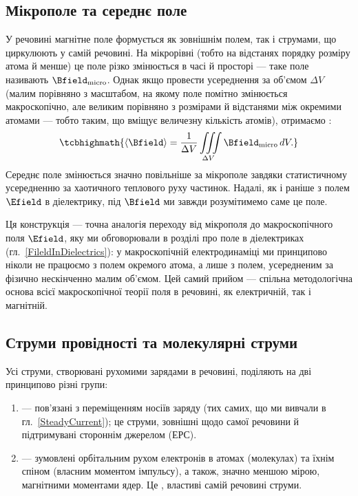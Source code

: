 \subsection*{Мікрополе та середнє поле}

У речовині магнітне поле формується як зовнішнім полем, так і струмами, що циркулюють у самій речовині. На мікрорівні (тобто на відстанях порядку
розміру атома й менше) це поле різко змінюється в часі й просторі --- таке поле називають  $\Bfield_\text{micro}$. Однак якщо
провести усереднення за  об'ємом $\Delta V$ (малим порівняно з масштабом, на якому поле помітно змінюється
макроскопічно, але великим порівняно з розмірами й відстанями між окремими атомами --- тобто таким, що вміщує величезну кількість атомів), отримаємо
:
\begin{equation}\label{eq:AvgField}
	\tcbhighmath{
		\langle\Bfield\rangle = \frac1{\Delta V}\iiint\limits_{\Delta V} \Bfield_\text{micro}\, dV.
	}
\end{equation}
Середнє поле змінюється значно повільніше за мікрополе завдяки статистичному усередненню за хаотичного теплового руху частинок. Надалі, як і
раніше з полем $\Efield$ в діелектрику, під $\Bfield$ ми завжди розумітимемо саме це  поле.

\begin{Attention}
	Ця конструкція --- точна аналогія переходу від мікрополя до макроскопічного поля $\Efield$, яку ми обговорювали в розділі про поле в
	діелектриках (гл.~\ref{FileldInDielectrics}): у макроскопічній електродинаміці ми принципово ніколи не працюємо з полем окремого атома, а лише
	з полем, усередненим за фізично нескінченно малим об'ємом. Цей самий прийом --- спільна методологічна основа всієї макроскопічної теорії поля
	в речовині, як електричній, так і магнітній.
\end{Attention}

\subsection*{Струми провідності та молекулярні струми}

Усі струми, створювані рухомими зарядами в речовині, поділяють на дві принципово різні групи:
\begin{enumerate}
	\item {} --- пов'язані з переміщенням  носіїв заряду (тих самих, що ми вивчали в
	      гл.~\ref{SteadyCurrent}); це  струми, зовнішні щодо самої речовини й підтримувані стороннім джерелом (ЕРС).
	\item {} --- зумовлені орбітальним рухом електронів в атомах (молекулах) та їхнім спіном (власним моментом імпульсу), а
	      також, значно меншою мірою, магнітними моментами ядер. Це , властиві самій речовині струми.
\end{enumerate}

